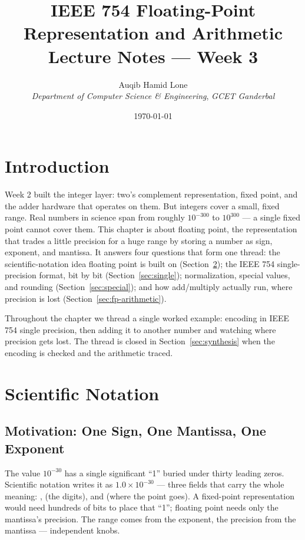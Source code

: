 \documentclass[11pt]{article}
\title{IEEE 754 Floating-Point Representation and Arithmetic\\\large Lecture Notes --- Week 3}
\author{Auqib Hamid Lone\\[0.3em]
  \emph{Department of Computer Science \& Engineering}, \emph{GCET Ganderbal}}
\date{\today}
\begin{document}
\maketitle

\section{Introduction}

Week 2 built the integer layer: two's complement representation, fixed point, and the adder hardware that operates on them. But integers cover a small, fixed range. Real numbers in science span from roughly $10^{-300}$ to $10^{300}$ --- a single fixed point cannot cover them. This chapter is about  floating point, the representation that trades a little precision for a huge range by storing a number as sign, exponent, and mantissa. It answers four questions that form one thread: the scientific-notation idea floating point is built on (Section~\ref{sec:sci-notation}); the IEEE 754 single-precision format, bit by bit (Section~\ref{sec:single}); normalization, special values, and rounding (Section~\ref{sec:special}); and how add/multiply actually run, where precision is lost (Section~\ref{sec:fp-arithmetic}).

Throughout the chapter we thread a single worked example: encoding  in IEEE 754 single precision, then adding it to another number and watching where precision gets lost. The thread is closed in Section~\ref{sec:synthesis} when the encoding is checked and the arithmetic traced.

\section{Scientific Notation}
\label{sec:sci-notation}

\subsection{Motivation: One Sign, One Mantissa, One Exponent}

The value $10^{-30}$ has a single significant ``1'' buried under thirty leading zeros. Scientific notation writes it as $1.0 \times 10^{-30}$ --- three fields that carry the whole meaning: ,  (the digits), and  (where the point goes). A fixed-point representation would need hundreds of bits to place that ``1''; floating point needs only the mantissa's precision. The range comes from the exponent, the precision from the mantissa --- independent knobs.
\end{document}
